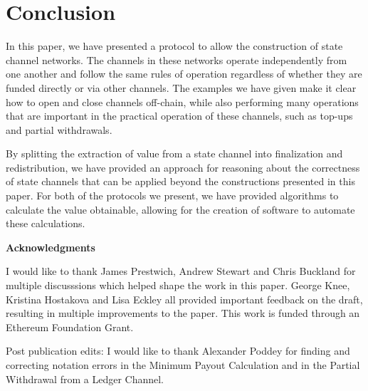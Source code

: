 \section{Conclusion}

In this paper, we have presented a protocol to allow the construction of state channel networks.
The channels in these networks operate independently from one another and follow the same rules of operation regardless of whether they are funded directly or via other channels.
The examples we have given make it clear how to open and close channels off-chain, while also performing many operations that are important in the practical operation of these channels, such as top-ups and partial withdrawals.

By splitting the extraction of value from a state channel into finalization and redistribution, we have provided an approach for reasoning about the correctness of state channels that can be applied beyond the constructions presented in this paper.
For both of the protocols we present, we have provided algorithms to calculate the value obtainable, allowing for the creation of software to automate these calculations.



\textbf{Acknowledgments}

I would like to thank James Prestwich, Andrew Stewart and Chris Buckland for multiple discusssions which helped shape the work in this paper. 
George Knee, Kristina Hostakova and Lisa Eckley all provided important feedback on the draft, resulting in multiple improvements to the paper.
This work is funded through an Ethereum Foundation Grant.

Post publication edits: I would like to thank Alexander Poddey for finding and correcting notation errors in the Minimum Payout Calculation and in the Partial Withdrawal from a Ledger Channel.

